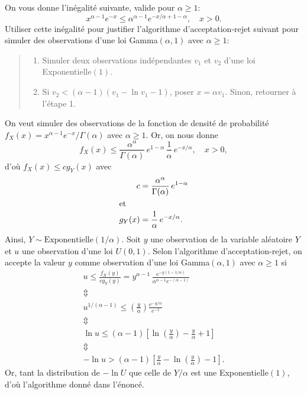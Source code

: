 \begin{exercice}
  On vous donne l'inégalité suivante, valide pour $\alpha \geq 1$:
  \begin{displaymath}
    x^{\alpha - 1} e^{-x}
    \leq \alpha^{\alpha - 1} e^{-x/\alpha + 1 -  \alpha}, \quad x > 0.
  \end{displaymath}
  Utiliser cette inégalité pour justifier l'algorithme
  d'acceptation-rejet suivant pour simuler des observations d'une loi
  Gamma$(\alpha, 1)$ avec $\alpha \geq 1$:
  \begin{quote}
    \begin{enumerate}[1.]
    \item Simuler deux observations indépendantes $v_1$ et $v_2$ d'une
      loi Exponentielle$(1)$.
    \item Si $v_2 < (\alpha - 1)(v_1 - \ln v_1 - 1)$, poser $x =
      \alpha v_1$. Sinon, retourner à l'étape 1.
    \end{enumerate}
  \end{quote}
  \begin{sol}
    On veut simuler des observations de la fonction de densité de
    probabilité $f_X(x) = x^{\alpha - 1} e^{-x}/\Gamma(\alpha)$ avec
    $\alpha \geq 1$. Or, on nous donne
    \begin{displaymath}
      f_X(x) \leq \frac{\alpha^\alpha}{\Gamma(\alpha)}\,
      e^{1 - \alpha}\,
      \frac{1}{\alpha}\, e^{-x/\alpha}, \quad x > 0,
    \end{displaymath}
    d'où $f_X(x) \leq c g_Y(x)$ avec
    \begin{align*}
      c
      &= \frac{\alpha^\alpha}{\Gamma(\alpha)}\, e^{1 - \alpha} \\
      \intertext{et}
      g_Y(x)
      &= \frac{1}{\alpha}\, e^{-x/\alpha}.
    \end{align*}
    Ainsi, $Y \sim \text{Exponentielle}(1/\alpha)$. Soit $y$ une
    observation de la variable aléatoire $Y$ et $u$ une observation
    d'une loi $U(0, 1)$. Selon l'algorithme d'acceptation-rejet, on
    accepte la valeur $y$ comme observation d'une loi Gamma$(\alpha,
    1)$ avec $\alpha \geq 1$ si
    \begin{gather*}
      u \leq \frac{f_X(y)}{c g_Y(y)} =
      y^{\alpha - 1}\, \frac{e^{-y (1 - 1/\alpha)}}{\alpha^{\alpha -
          1} e^{-(\alpha - 1)}} \\
      \Updownarrow \\
      u^{1/(\alpha - 1)} \leq \left( \frac{y}{\alpha} \right)
      \frac{e^{-y/\alpha}}{e^{-1}} \\
      \Updownarrow \\
      \ln u \leq (\alpha - 1)
      \left[
        \ln \left( \frac{y}{\alpha} \right) - \frac{y}{\alpha} + 1
      \right] \\
      \Updownarrow \\
      - \ln u > (\alpha - 1)
      \left[
        \frac{y}{\alpha} - \ln \left( \frac{y}{\alpha} \right) - 1
      \right].
    \end{gather*}
    Or, tant la distribution de $-\ln U$ que celle de $Y/\alpha$ est
    une Exponentielle$(1)$, d'où l'algorithme donné dans l'énoncé.
  \end{sol}
\end{exercice}


